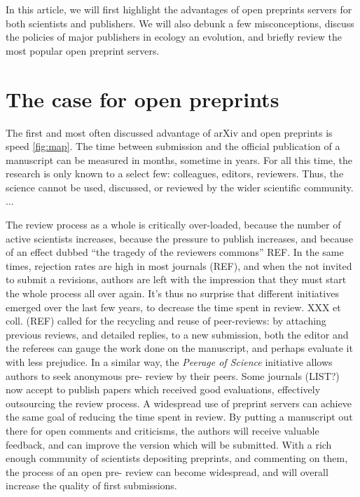 \documentclass[letterpaper,twocolumn,superscriptaddress,showkeys]{revtex4}
\begin{document}
In this article, we will first highlight the advantages of open preprints
servers for both scientists and publishers. We will also debunk a few
misconceptions, discuss the policies of major publishers in ecology an
evolution, and briefly review the most popular open preprint servers.

\section{The case for open preprints}

The first and most often discussed advantage of arXiv and open preprints is
speed \ref{fig:map}. The time between submission and the official publication of
a manuscript can be measured in months, sometime in years. For all this time,
the research is only known to a select few: colleagues, editors, reviewers.
Thus, the science cannot be used, discussed, or reviewed by the wider scientific
community. ...


The review process as a whole is critically over-loaded, because the number of
active scientists increases, because the pressure to publish increases, and
because of an effect dubbed ``the tragedy of the reviewers commons'' REF.  In
the same times, rejection rates are high in most journals (REF), and when the
not invited to submit a revisions, authors are left with the impression that
they must start the whole process all over again. It's thus no surprise that
different initiatives emerged over the last few years, to decrease the time
spent in review. XXX et coll. (REF) called for the recycling and reuse of
peer-reviews: by attaching previous reviews, and detailed replies, to a new
submission, both the editor and the referees can gauge the work done on the
manuscript, and perhaps evaluate it with less prejudice. In a similar way, the
\emph{Peerage of Science} initiative allows authors to seek anonymous pre-
review by their peers. Some journals (LIST?) now accept to publish papers
which received good evaluations, effectively outsourcing the review process. A
widespread use of preprint servers can achieve the same goal of reducing the
time spent in review. By putting a manuscript out there for open comments and
criticisms, the authors will receive valuable feedback, and can improve the
version which will be submitted. With a rich enough community of scientists
depositing preprints, and commenting on them, the process of an open pre-
review can become widespread, and will overall increase the quality of first
submissions.
\end{document}
